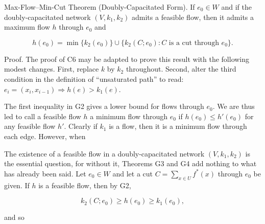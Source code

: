 Max-Flow–Min-Cut Theorem (Doubly-Capacitated Form). If $e_0 \in W$ and if the doubly-capacitated network $(V, k_1, k_2)$ admits a feasible flow, then it admits a maximum flow $h$ through $e_0$ and

$$h(e_0) = \min\{k_2(e_0)\} \cup \{k_2(C; e_0): C \text{ is a cut through } e_0\}.$$

Proof. The proof of C6 may be adapted to prove this result with the following modest changes. First, replace $k$ by $k_2$ throughout. Second, alter the third condition in the definition of “unsaturated path” to read: $e_i = (x_i, x_{i-1}) \Rightarrow h(e) > k_1(e).$

The first inequality in G2 gives a lower bound for flows through $e_0$. We are thus led to call a feasible flow $h$ a minimum flow through $e_0$ if $h(e_0) \leq h'(e_0)$ for any feasible flow $h'$. Clearly if $k_1$ is a flow, then it is a minimum flow through each edge. However, when

The existence of a feasible flow in a doubly-capacitated network $(V, k_1, k_2)$ is the essential question, for without it, Theorems G3 and G4 add nothing to what has already been said. Let $e_0 \in W$ and let a cut $C = \sum_{x \in U} f^*(x)$ through $e_0$ be given. If $h$ is a feasible flow, then by G2,

$$k_2(C; e_0) \geq h(e_0) \geq k_1(e_0),$$

and so

